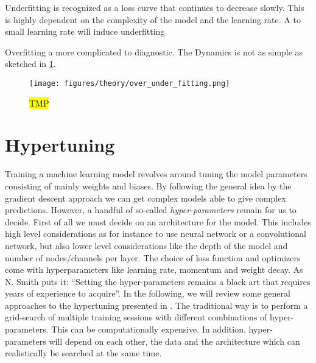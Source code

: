

Underfitting is recognized as a loss curve that continues to decrease slowly. This is highly dependent on the complexity of the model and the learning rate. A to small learning rate will induce underfitting

Overfitting a more complicated to diagnostic. The Dynamics is not as simple as sketched in \cref{fig:over_under_fitting}.


\begin{figure}[H]
  \centering
  \texttt{[image: figures/theory/over\_under\_fitting.png]}
  \caption{\hl{TMP} \cite{smith2018disciplined}}
  \label{fig:over_under_fitting}
\end{figure}




\section{Hypertuning}
Training a machine learning model revolves around tuning the model parameters
consisting of mainly weights and biases. By following the general idea by the
gradient descent approach we can get complex models able to give complex
predictions. However, a handful of so-called \textit{hyper-parameters} remain
for us to decide. First of all we must decide on an architecture for the model.
This includes high level considerations as for instance to use neural network or
a convolutional network, but also lower level considerations like the depth of
the model and number of nodes/channels per layer. The choice of loss function
and optimizers come with hyperparameters like learning rate, momentum and weight
decay. As N. Smith \cite{smith2018disciplined} puts it: ``Setting the
hyper-parameters remains a black art that requires years of experience to
acquire''. In the following, we will review some general approaches to the
hypertuning presented in \cite{smith2018disciplined}. The traditional way is to
perform a grid-search of multiple training sessions with different combinations
of hyper-parameters. This can be computationally expensive. In addition, hyper-parameters will depend on each other, the data and the architecture which can realistically be searched at the same time. 

